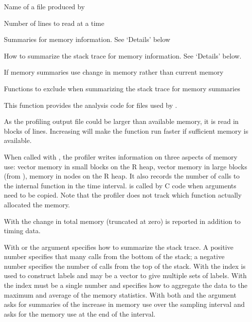%
\begin{Arguments}
\begin{ldescription}
\item[\code{filename}] Name of a file produced by 
\item[\code{chunksize}] Number of lines to read at a time
\item[\code{memory}] Summaries for memory information.  See `Details' below
\item[\code{index}] How to summarize the stack trace for memory
information.  See `Details' below.
\item[\code{diff}] If  memory summaries use change in memory
rather than current memory
\item[\code{exclude}] Functions to exclude when summarizing the stack trace
for memory summaries

\end{ldescription}
\end{Arguments}
%
\begin{Details}\relax
This function provides the analysis code for  files
used by .

As the profiling output file could be larger than available memory, it
is read in blocks of  lines.  Increasing 
will make the function run faster if sufficient memory is available.

When called with , the profiler writes
information on three aspects of memory use: vector memory in small
blocks on the R heap, vector memory in large blocks (from
), memory in nodes on the R heap.  It also records the number of
calls to the internal function  in the time
interval.   is called by C code when arguments need to be
copied.  Note that the profiler does not track which function actually
allocated the memory.

With  the change in total memory (truncated at zero)
is reported in addition to timing data. 

With  or  the 
argument specifies how to summarize the stack trace.  A positive number
specifies that many calls from the bottom of the stack; a negative
number specifies the number of calls from the top of the stack.  With
 the index is used to construct labels and may be
a vector to give multiple sets of labels.  With  the
index must be a single number and specifies how to aggregate the data to
the maximum and average of the memory statistics.  With both
 and  the argument
 asks for summaries of the increase in memory use over
the sampling interval and  asks for the memory use at
the end of the interval.
\end{Details}
